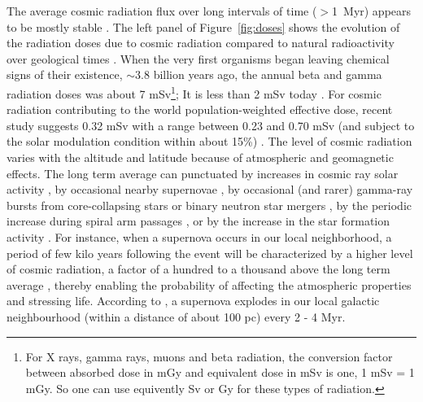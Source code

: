 \documentclass[a4paper,11pt]{article}
\begin{document}
 The average cosmic radiation flux over long intervals of time ($>$1~Myr) appears to be mostly stable \cite{lavielle99}. The left panel of  Figure~\ref{fig:doses} shows the evolution of the radiation doses due to cosmic radiation compared to natural radioactivity over geological times \cite{karam99,karam03}. When the very first organisms began leaving chemical signs of their existence, $\sim$3.8 billion years ago, the annual beta and gamma radiation doses  was about 7 mSv\footnote{For X rays, gamma rays, muons and beta radiation, the conversion factor between absorbed dose in mGy and equivalent dose in mSv is one,  1 mSv = 1 mGy. So one can use equivently Sv or Gy for these types of radiation.}; It is less than 2 mSv today \cite{karam99}.  For cosmic radiation contributing to the world population-weighted effective dose, recent study suggests 0.32 mSv with a range between 0.23 and 0.70 mSv (and subject to the solar modulation condition within about 15\%) \cite{Sato16}. %
 The level of cosmic radiation varies with the altitude and latitude because of atmospheric and geomagnetic effects. The long term average can punctuated by increases in cosmic ray solar activity \citep{Winckler58}, by occasional nearby supernovae \cite{Ellis95,thomas16}, by occasional (and rarer) gamma-ray bursts  from core-collapsing stars \cite{globus15} or binary neutron star mergers \cite{gottlieb21}, by the periodic increase during spiral arm passages \cite{shaviv02}, or by the increase in the star formation activity \cite{Svensmark98}. For instance, when a supernova occurs in our local neighborhood, a period of few kilo years following the event will be characterized by a higher level of cosmic radiation, a factor of a hundred to a thousand above the long term average \cite{melott17},  thereby enabling the probability of affecting the atmospheric properties and stressing life.  According to \cite{Wallner16}, a supernova explodes in our local galactic neighbourhood (within a distance of about 100 pc)  every 2 - 4 Myr. 
 
\end{document}
